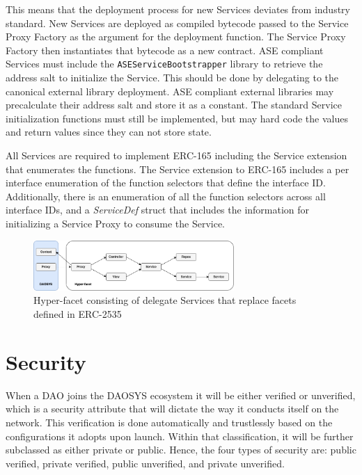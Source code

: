 \documentclass[journal,twocolumn,12pt]{ieeesyscoin}
\begin{document}
This means that the deployment process for new Services deviates from industry standard. New Services are deployed as compiled bytecode passed to the Service Proxy Factory as the argument for the deployment function. The Service Proxy Factory then instantiates that bytecode as a new contract. ASE compliant Services must include the \texttt{ASEServiceBootstrapper} library to retrieve the address salt to initialize the Service. This should be done by delegating to the canonical external library deployment. ASE compliant external libraries may precalculate their address salt and store it as a constant. The standard Service initialization functions must still be implemented, but may hard code the values and return values since they can not store state.

All Services are required to implement ERC-165 including the Service extension that enumerates the functions. The Service extension to ERC-165 includes a per interface enumeration of the function selectors that define the interface ID. Additionally, there is an enumeration of all the function selectors across all interface IDs, and a \textit{ServiceDef} struct that includes the information for initializing a Service Proxy to consume the Service.

\begin{figure}[h!]
\includegraphics[width=3in]{img/hyper_facet.png}
\caption{Hyper-facet consisting of delegate Services that replace facets defined in ERC-2535} 
\label{fig:hyper_facet}
\end{figure} 

\section{Security}
\label{sec:security}

When a DAO joins the DAOSYS ecosystem it will be either verified or unverified, which is a security attribute that will dictate the way it conducts itself on the network. This verification is done automatically and trustlessly based on the configurations it adopts upon launch. Within that classification, it will be further subclassed as either private or public. Hence, the four types of security are: public verified, private verified, public unverified, and private unverified.
\end{document}
